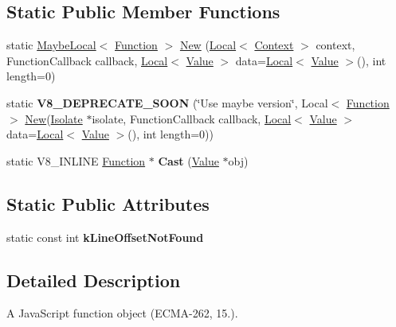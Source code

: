 \subsection*{Static Public Member Functions}
\begin{DoxyCompactItemize}
\item 
static \hyperlink{classv8_1_1MaybeLocal}{Maybe\+Local}$<$ \hyperlink{classv8_1_1Function}{Function} $>$ \hyperlink{classv8_1_1Function_a53f1f98d49eef79339460e47f2b1e29e}{New} (\hyperlink{classv8_1_1Local}{Local}$<$ \hyperlink{classv8_1_1Context}{Context} $>$ context, Function\+Callback callback, \hyperlink{classv8_1_1Local}{Local}$<$ \hyperlink{classv8_1_1Value}{Value} $>$ data=\hyperlink{classv8_1_1Local}{Local}$<$ \hyperlink{classv8_1_1Value}{Value} $>$(), int length=0)
\item 
\hypertarget{classv8_1_1Function_aa209acdf0cdc4ba1cbc5c74d44696529}{}static {\bfseries V8\+\_\+\+D\+E\+P\+R\+E\+C\+A\+T\+E\+\_\+\+S\+O\+O\+N} (\char`\"{}Use maybe version\char`\"{}, Local$<$ \hyperlink{classv8_1_1Function}{Function} $>$ \hyperlink{classv8_1_1Function_a53f1f98d49eef79339460e47f2b1e29e}{New}(\hyperlink{classv8_1_1Isolate}{Isolate} $\ast$isolate, Function\+Callback callback, \hyperlink{classv8_1_1Local}{Local}$<$ \hyperlink{classv8_1_1Value}{Value} $>$ data=\hyperlink{classv8_1_1Local}{Local}$<$ \hyperlink{classv8_1_1Value}{Value} $>$(), int length=0))\label{classv8_1_1Function_aa209acdf0cdc4ba1cbc5c74d44696529}

\item 
\hypertarget{classv8_1_1Function_af24f38bcc0769519816cda1f6a154ff8}{}static V8\+\_\+\+I\+N\+L\+I\+N\+E \hyperlink{classv8_1_1Function}{Function} $\ast$ {\bfseries Cast} (\hyperlink{classv8_1_1Value}{Value} $\ast$obj)\label{classv8_1_1Function_af24f38bcc0769519816cda1f6a154ff8}

\end{DoxyCompactItemize}
\subsection*{Static Public Attributes}
\begin{DoxyCompactItemize}
\item 
\hypertarget{classv8_1_1Function_acf0af24f79908e405a6ac435277596d9}{}static const int {\bfseries k\+Line\+Offset\+Not\+Found}\label{classv8_1_1Function_acf0af24f79908e405a6ac435277596d9}

\end{DoxyCompactItemize}


\subsection{Detailed Description}
A Java\+Script function object (E\+C\+M\+A-\/262, 15.). 

